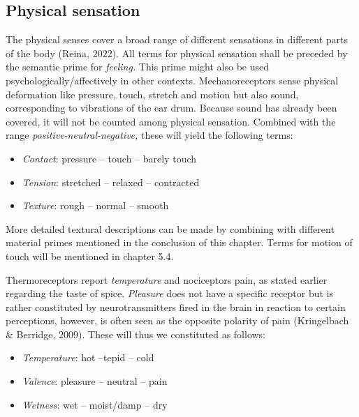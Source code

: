 \vfill

\subsection{Physical sensation}

The physical senses cover a broad range of different sensations in different parts of the body (Reina, 2022). All terms for physical sensation shall be preceded by the semantic prime for \textit{feeling.} This prime might also be used psychologically/affectively in other contexts. Mechanoreceptors sense physical deformation like pressure, touch, stretch and motion but also sound, corresponding to vibrations of the ear drum. Because sound has already been covered, it will not be counted among physical sensation. Combined with the range \textit{positive-neutral-negative,} these will yield the following terms:  

\begin{itemize}
\item   \textit{Contact}: pressure – touch – barely touch  

\item   \textit{Tension}: stretched – relaxed – contracted  

\item   \textit{Texture}: rough – normal – smooth 
\end{itemize}

More detailed textural descriptions can be made by combining with different material primes mentioned in the conclusion of this chapter. Terms for motion of touch will be mentioned in chapter 5.4.  

Thermoreceptors report \textit{temperature} and nociceptors pain, as stated earlier regarding the taste of spice. \textit{Pleasure} does not have a specific receptor but is rather constituted by neurotransmitters fired in the brain in reaction to certain perceptions, however, is often seen as the opposite polarity of pain (Kringelbach \& Berridge, 2009). These will thus we constituted as follows:  


\begin{itemize}
\item   \textit{Temperature}: hot –tepid – cold  

\item   \textit{Valence}: pleasure – neutral – pain  

\item   \textit{Wetness}: wet – moist/damp – dry 
\end{itemize}

